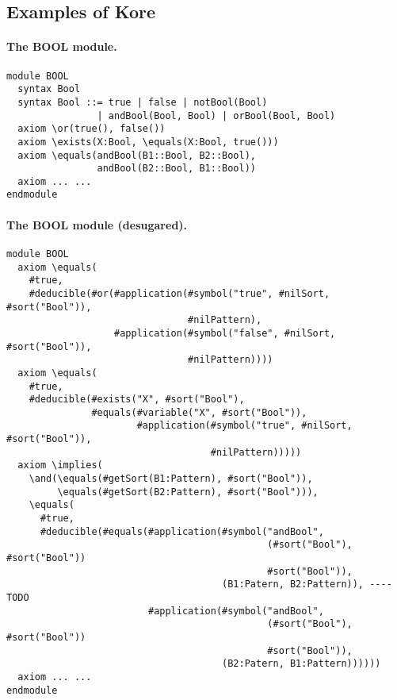 \documentclass[UTF8]{article}
\theoremstyle{plain}
\theoremstyle{definition}
\theoremstyle{remark}
\begin{document}
\subsection{Examples of Kore}
\label{sec:examples-of-kore}


\paragraph{The {\small BOOL} module.}\quad
\begin{Verbatim}[fontsize=\small]
module BOOL
  syntax Bool
  syntax Bool ::= true | false | notBool(Bool)
                | andBool(Bool, Bool) | orBool(Bool, Bool)
  axiom \or(true(), false())
  axiom \exists(X:Bool, \equals(X:Bool, true()))
  axiom \equals(andBool(B1::Bool, B2::Bool), 
                andBool(B2::Bool, B1::Bool))
  axiom ... ...
endmodule
\end{Verbatim}

\paragraph{The {\small BOOL} module (desugared).}\quad
\begin{Verbatim}[fontsize=\small]
module BOOL
  axiom \equals(
    #true,
    #deducible(#or(#application(#symbol("true", #nilSort, #sort("Bool")),
                                #nilPattern), 
                   #application(#symbol("false", #nilSort, #sort("Bool")),
                                #nilPattern))))
  axiom \equals(
    #true,
    #deducible(#exists("X", #sort("Bool"), 
               #equals(#variable("X", #sort("Bool")), 
                       #application(#symbol("true", #nilSort, #sort("Bool")),
                                    #nilPattern)))))
  axiom \implies(
    \and(\equals(#getSort(B1:Pattern), #sort("Bool")), 
         \equals(#getSort(B2:Pattern), #sort("Bool"))),
    \equals(
      #true,
      #deducible(#equals(#application(#symbol("andBool", 
                                              (#sort("Bool"), #sort("Bool"))
                                              #sort("Bool")), 
                                      (B1:Patern, B2:Pattern)), ---- TODO
                         #application(#symbol("andBool", 
                                              (#sort("Bool"), #sort("Bool"))
                                              #sort("Bool")), 
                                      (B2:Patern, B1:Pattern))))))
  axiom ... ...
endmodule
\end{Verbatim}
\end{document}
